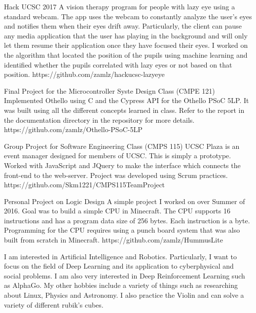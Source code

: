 \documentclass{resume}
\begin{document}
{Hack UCSC 2017}
{A vision therapy program for people with lazy eye using a standard 
webcam. The app uses the webcam to constantly analyze the user's eyes 
and notifies them when their eyes drift away. Particularly, the client
can pause any media application that the user has playing in the 
background and will only let them resume their application once they 
have focused their eyes. I worked on the algorithm that located the
position of the pupils using machine learning and identified whether
the pupils correlated with lazy eyes or not based on that position.}
{https://github.com/zamlz/hackucsc-lazyeye}

{Final Project for the Microcontroller Syste Design Class (CMPE 121)}
{Implemented Othello using C and the Cypress API for the Othello PSoC 5LP.
It was built using all the different concepts learned in class. Refer to the
report in the documentation directory in the repository for more details.}
{https://github.com/zamlz/Othello-PSoC-5LP}

{Group Project for Software Engineering Class (CMPS 115)}
{UCSC Plaza is an event manager designed for members of UCSC. This is simply
a prototype. Worked with JavaScript and JQuery to make the interface which
connects the front-end to the web-server. Project was developed using Scrum
practices.}
{https://github.com/Skm1221/CMPS115TeamProject}

{Personal Project on Logic Design}
{A simple project I worked on over Summer of 2016. Goal was to build a simple
CPU in Minecraft. The CPU supports 16 instructions and has a program data
size of 256 bytes. Each instruction is a byte. Programming for the CPU
requires using a punch board system that was also built from scratch in
Minecraft.}
{https://github.com/zamlz/HummusLite}

I am interested in Artificial Intelligence and Robotics. Particularly,
I want to focus on the field of Deep Learning and its application to
cyberphysical and social problems. I am also very interested in 
Deep Reinforcement Learning such as AlphaGo. My other hobbies include a variety
of things such as researching about Linux, Physics and Astronomy. I
also practice the Violin and can solve a variety of different rubik's
cubes.
\end{document}
